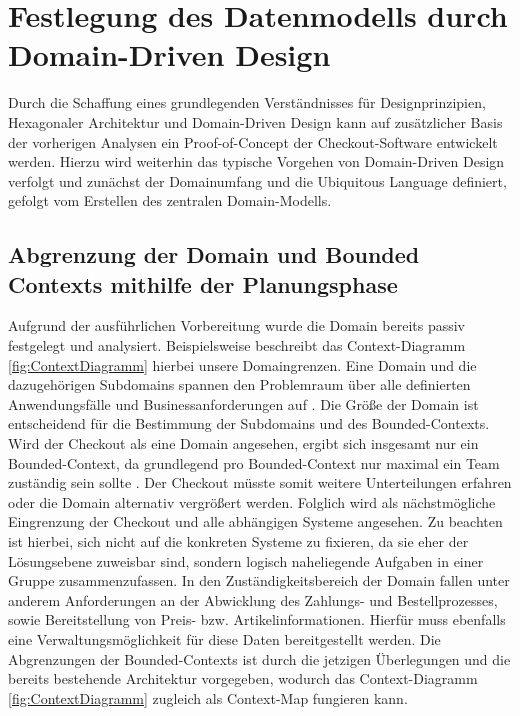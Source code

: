 

\chapter{Festlegung des Datenmodells durch Domain-Driven Design}

Durch die Schaffung eines grundlegenden Verständnisses für Designprinzipien, Hexagonaler Architektur und Domain-Driven Design kann auf zusätzlicher Basis der vorherigen Analysen ein Proof-of-Concept der Checkout-Software entwickelt werden. Hierzu wird weiterhin das typische Vorgehen von Domain-Driven Design verfolgt und zunächst der Domainumfang und die Ubiquitous Language definiert, gefolgt vom Erstellen des zentralen Domain-Modells.

\section{Abgrenzung der Domain und Bounded Contexts mithilfe der Planungsphase}

Aufgrund der ausführlichen Vorbereitung wurde die Domain bereits passiv festgelegt und analysiert. Beispielsweise beschreibt das Context-Diagramm \ref{fig:ContextDiagramm} hierbei unsere Domaingrenzen. Eine Domain und die dazugehörigen Subdomains spannen den Problemraum über alle definierten Anwendungsfälle und Businessanforderungen auf \cite[S. 56]{Vernon.2015}. Die Größe der Domain ist entscheidend für die Bestimmung der Subdomains und des Bounded-Contexts. Wird der Checkout als eine Domain angesehen, ergibt sich insgesamt nur ein Bounded-Context, da grundlegend pro Bounded-Context nur maximal ein Team zuständig sein sollte \cite{Brandolini.2021}. Der Checkout müsste somit weitere Unterteilungen erfahren oder die Domain alternativ vergrößert werden. Folglich wird als nächstmögliche Eingrenzung der Checkout und alle abhängigen Systeme angesehen. Zu beachten ist hierbei, sich nicht auf die konkreten Systeme zu fixieren, da sie eher der Lösungsebene zuweisbar sind, sondern logisch naheliegende Aufgaben in einer Gruppe zusammenzufassen. In den Zuständigkeitsbereich der Domain fallen unter anderem Anforderungen an der Abwicklung des Zahlungs- und Bestellprozesses, sowie Bereitstellung von Preis- bzw. Artikelinformationen. Hierfür muss ebenfalls eine Verwaltungsmöglichkeit für diese Daten bereitgestellt werden. Die Abgrenzungen der Bounded-Contexts ist durch die jetzigen Überlegungen und die bereits bestehende Architektur vorgegeben, wodurch das Context-Diagramm \ref{fig:ContextDiagramm} zugleich als Context-Map fungieren kann.

